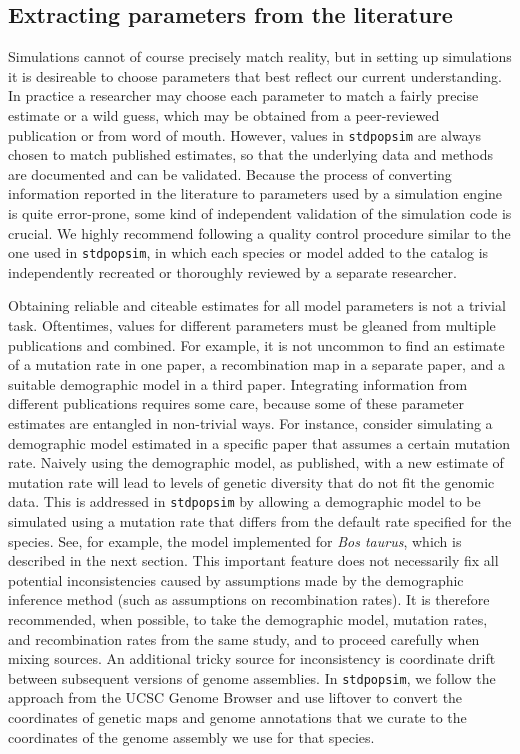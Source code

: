 \documentclass[hidelinks]{article}
\newcommand{\stdpopsim}{\texttt{stdpopsim}\xspace}
\begin{document}
\subsection*{Extracting parameters from the literature}

Simulations cannot of course precisely match reality, but in setting up simulations
it is desireable to choose parameters that best reflect our current understanding.
In practice a researcher may choose each parameter to match a fairly precise estimate or a wild guess,
which may be obtained from a peer-reviewed publication or from word of mouth.
However, values in \stdpopsim are always chosen to match published estimates,
so that the underlying data and methods are documented and can be validated.
Because the process of converting information reported in the literature to parameters used by a simulation engine is quite error-prone,
some kind of independent validation of the simulation code is crucial.
We highly recommend following a quality control procedure similar to the one used in \stdpopsim,
in which each species or model added to the catalog is independently recreated or thoroughly reviewed by a separate researcher.


Obtaining reliable and citeable estimates for all model parameters is not a trivial task.
Oftentimes, values for different parameters must be gleaned from multiple publications and combined.
For example, it is not uncommon to find an estimate of a mutation rate in one paper,
a recombination map in a separate paper, and a suitable demographic model in a third paper.
Integrating information from different publications requires some care,
because some of these parameter estimates are entangled in non-trivial ways.
For instance, consider simulating a demographic model estimated in a specific paper that assumes
a certain mutation rate.
Naively using the demographic model, as published, with a new estimate of mutation rate
will lead to levels of genetic diversity that do not fit the genomic data.
This is addressed in \stdpopsim by allowing a demographic model to be simulated using a mutation rate that differs from the default rate specified for the species.
See, for example, the model implemented for \emph{Bos taurus},
which is described in the next section.
%
This important feature does not necessarily fix all potential inconsistencies
caused by assumptions made by the demographic inference method
(such as assumptions on recombination rates).
It is therefore recommended, when possible, to take the demographic model,
mutation rates, and recombination rates from the same study,
and to proceed carefully when mixing sources.
%
An additional tricky source for inconsistency is coordinate drift between 
subsequent versions of genome assemblies.
In \stdpopsim, we follow the approach from the UCSC Genome Browser
and use liftover to convert the coordinates of genetic maps and genome annotations
that we curate to the coordinates of the genome assembly we use for that species.
\end{document}
